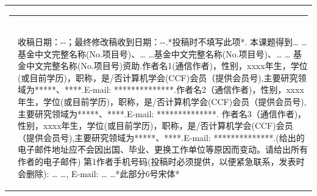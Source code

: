 \documentclass[10.5pt,compsoc]{CjC}
\theoremstyle{mystyle}
\begin{document}
\begin{table}[!t]
\setlength{\tabcolsep}{2pt}
\begin{tabular}{p{0.05cm}p{16.15cm}}
\multicolumn{2}{l}{\rule[4mm]{40mm}{0.1mm}}\\[-3mm]
&\begin{CJK*}{UTF8}{song}
收稿日期：\quad \quad -\quad -\quad ；最终修改稿收到日期：\quad \quad -\quad -\quad .*投稿时不填写此项*. 本课题得到… …基金中文完整名称(No.项目号)、… …基金中文完整名称(No.项目号)、… … 基金中文完整名称(No.项目号)资助.作者名1(通信作者)，性别，xxxx年生，学位(或目前学历)，职称，是/否计算机学会(CCF)会员（提供会员号),主要研究领域为*****、****.E-mail: **************.作者名2（通信作者)，性别，xxxx年生，学位(或目前学历)，职称，是/否计算机学会(CCF)会员（提供会员号),主要研究领域为*****、****.E-mail: **************. 作者名3（通信作者)，性别，xxxx年生，学位(或目前学历)，职称，是/否计算机学会(CCF)会员（提供会员号),主要研究领域为*****、****.E-mail: **************.(给出的电子邮件地址应不会因出国、毕业、更换工作单位等原因而变动。请给出所有作者的电子邮件)
第1作者手机号码(投稿时必须提供，以便紧急联系，发表时会删除): … …, E-mail: … …*此部分6号宋体*
\end{CJK*}
\end{tabular}\end{table}
\clearpage\clearpage
\begin{strip}
\vspace {-13mm}
\end{strip}
    \linespread{1.15}
\end{document}
